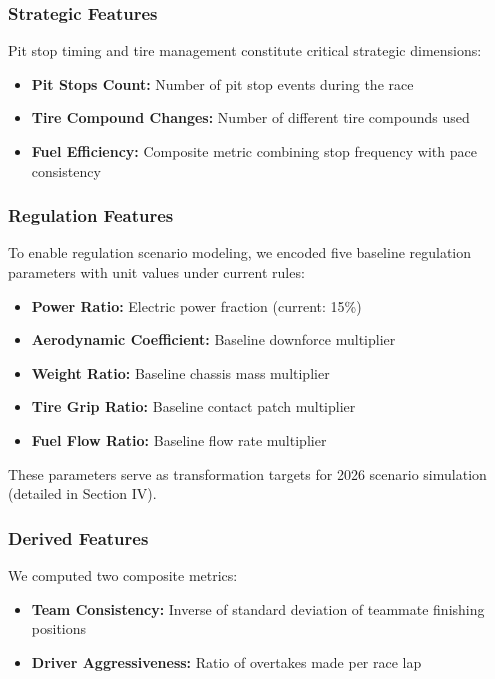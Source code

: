 \documentclass[conference]{IEEEtran}
\begin{document}
\subsubsection{Strategic Features}

Pit stop timing and tire management constitute critical strategic dimensions:

\begin{itemize}
    \item \textbf{Pit Stops Count:} Number of pit stop events during the race
    \item \textbf{Tire Compound Changes:} Number of different tire compounds used
    \item \textbf{Fuel Efficiency:} Composite metric combining stop frequency with pace consistency
\end{itemize}

\subsubsection{Regulation Features}

To enable regulation scenario modeling, we encoded five baseline regulation parameters with unit values under current rules:

\begin{itemize}
    \item \textbf{Power Ratio:} Electric power fraction (current: 15\%)
    \item \textbf{Aerodynamic Coefficient:} Baseline downforce multiplier
    \item \textbf{Weight Ratio:} Baseline chassis mass multiplier
    \item \textbf{Tire Grip Ratio:} Baseline contact patch multiplier
    \item \textbf{Fuel Flow Ratio:} Baseline flow rate multiplier
\end{itemize}

These parameters serve as transformation targets for 2026 scenario simulation (detailed in Section IV).

\subsubsection{Derived Features}

We computed two composite metrics:

\begin{itemize}
    \item \textbf{Team Consistency:} Inverse of standard deviation of teammate finishing positions
    \item \textbf{Driver Aggressiveness:} Ratio of overtakes made per race lap
\end{itemize}
\end{document}
